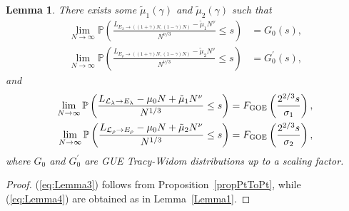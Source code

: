 \documentclass[12pt,a4paper]{article}
\numberwithin{equation}{section}
\newcommand{\GOE}{\mathrm{GOE}}
\newcommand{\Pb}{\mathbb{P}}
\newtheorem{lem}[prop]{Lemma}
\begin{document}
\begin{lem}\label{Lemma2}
There exists some $\tilde \mu_1(\gamma)$ and $\tilde \mu_2(\gamma)$ such that
\begin{equation}\label{eq:Lemma3}
\begin{aligned}
\lim_{N\to\infty} \Pb\left(\frac{L_{E_\lambda\to((1+\gamma) N, (1-\gamma)N)}-\tilde \mu_1 N^\nu}{N^{\nu/3}}\leq s\right)&=G_0(s),\\
\lim_{N\to\infty} \Pb\left(\frac{L_{E_\rho\to((1+\gamma) N, (1-\gamma)N)}-\tilde \mu_2 N^\nu}{N^{\nu/3}}\leq s\right)&=G^\prime_0(s),
\end{aligned}
\end{equation}
and
\begin{equation}\label{eq:Lemma4}
\begin{aligned}
\lim_{N\to\infty} \Pb\left(\frac{L_{{\cal L}_\lambda\to E_\lambda}-\mu_0 N+\tilde \mu_1 N^\nu}{N^{1/3}}\leq s\right)&= F_{\GOE}\left(\frac{2^{2/3}s}{\sigma_1}\right),\\
\lim_{N\to\infty} \Pb\left(\frac{L_{{\cal L}_\rho\to E_\rho}-\mu_0 N+\tilde \mu_2 N^\nu}{N^{1/3}}\leq s\right)&=F_{\GOE}\left(\frac{2^{2/3}s}{
\sigma_2}\right),
\end{aligned}
\end{equation}
where $G_0$ and $G^\prime_0$ are GUE Tracy-Widom distributions up to a scaling factor.
\end{lem}
\begin{proof}
(\ref{eq:Lemma3}) follows from Proposition~\ref{propPtToPt}, while (\ref{eq:Lemma4}) are obtained as in Lemma~\ref{Lemma1}.
\end{proof}
\end{document}
